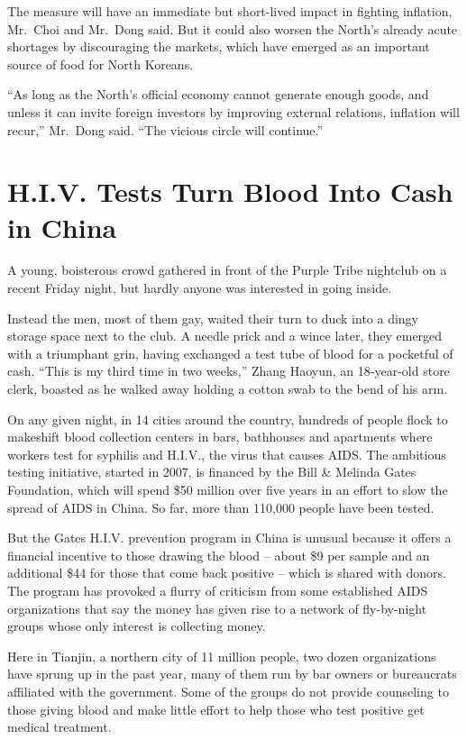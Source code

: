 ﻿\documentclass[12pt]{article}
\begin{document}
The measure will have an immediate but short-lived impact in fighting inflation, Mr.~Choi and
Mr.~Dong said. But it could also worsen the North's already acute shortages by discouraging the
markets, which have emerged as an important source of food for North Koreans.

``As long as the North's official economy cannot generate enough goods, and unless it can invite
foreign investors by improving external relations, inflation will recur,'' Mr.~Dong said. ``The
vicious circle will continue.''

\section{H.I.V. Tests Turn Blood Into Cash in China}

\lettrine{A}{} young, boisterous\cite{boisterous} crowd gathered in front of
the Purple Tribe nightclub on a recent Friday night, but hardly anyone was interested in going
inside.

Instead the men, most of them gay, waited their turn to duck into a dingy storage space next to the
club. A needle prick and a wince\cite{wince} later, they emerged with a triumphant\cite{triumphant}
grin, having exchanged a test tube of blood for a pocketful of cash. ``This is my third time in two
weeks,'' Zhang Haoyun, an 18-year-old store clerk, boasted as he walked away holding a cotton swab
to the bend of his arm.

On any given night, in 14 cities around the country, hundreds of people flock to makeshift blood
collection centers in bars, bathhouses and apartments where workers test for syphilis and H.I.V.,
the virus that causes AIDS. The ambitious testing initiative, started in 2007, is financed by the
Bill \& Melinda Gates Foundation, which will spend \$50 million over five years in an effort to slow
the spread of AIDS in China. So far, more than 110,000 people have been tested.

But the Gates H.I.V. prevention program in China is unusual because it offers a financial incentive
to those drawing the blood -- about \$9 per sample and an additional \$44 for those that come back
positive -- which is shared with donors. The program has provoked a flurry\cite{flurry} of criticism
from some established AIDS organizations that say the money has given rise to a network of
fly-by-night groups whose only interest is collecting money.

Here in Tianjin, a northern city of 11 million people, two dozen organizations have sprung up in the
past year, many of them run by bar owners or bureaucrats affiliated with the government. Some of the
groups do not provide counseling to those giving blood and make little effort to help those who test
positive get medical treatment.
\end{document}
